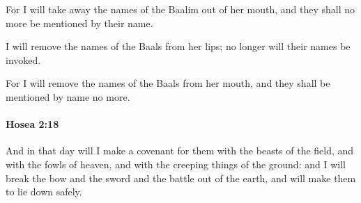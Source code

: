 			\begin{versebox}
					\item[BHS] 
					\item[LXX] 
					\item[ASV] For I will take away the names of the Baalim out of her mouth, and they shall no more be mentioned by their name.
					\item[NIV] I will remove the names of the Baals from her lips; no longer will their names be invoked.
					\item[NRSV] For I will remove the names of the Baals from her mouth, and they shall be mentioned by name no more.
			\end{versebox}

		\paragraph{Hosea 2:18} %
			\label{HOSEA-2-18}

			And in that day will I make a covenant for them with the beasts of the field, and with the fowls of heaven, and with the creeping things of the ground: and I will break the bow and the sword and the battle out of the earth, and will make them to lie down safely.

